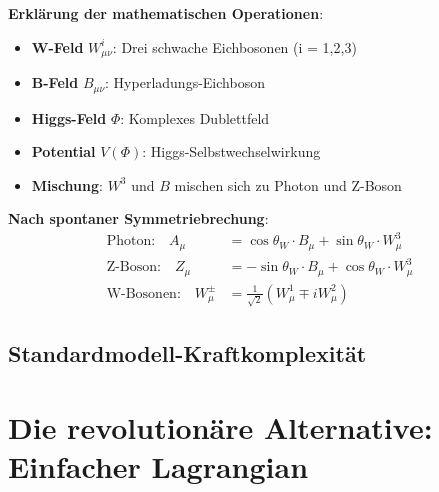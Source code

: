 	\textbf{Erklärung der mathematischen Operationen}:
	\begin{itemize}
		\item \textbf{W-Feld} $W_{\mu\nu}^i$: Drei schwache Eichbosonen (i = 1,2,3)
		\item \textbf{B-Feld} $B_{\mu\nu}$: Hyperladungs-Eichboson
		\item \textbf{Higgs-Feld} $\Phi$: Komplexes Dublettfeld
		\item \textbf{Potential} $V(\Phi)$: Higgs-Selbstwechselwirkung
		\item \textbf{Mischung}: $W^3$ und $B$ mischen sich zu Photon und Z-Boson
	\end{itemize}
	
	\textbf{Nach spontaner Symmetriebrechung}:
	\begin{align}
		\text{Photon:} \quad A_\mu &= \cos\theta_W \cdot B_\mu + \sin\theta_W \cdot W_\mu^3 \\
		\text{Z-Boson:} \quad Z_\mu &= -\sin\theta_W \cdot B_\mu + \cos\theta_W \cdot W_\mu^3 \\
		\text{W-Bosonen:} \quad W_\mu^\pm &= \frac{1}{\sqrt{2}}(W_\mu^1 \mp i W_\mu^2)
	\end{align}
	
	\subsection{Standardmodell-Kraftkomplexität}
	
	\begin{table}[htbp]
		\centering
		\caption{Standardmodell-Kraftkomplexität}
		\label{tab:sm_force_complexity}
	\end{table}
	
	\section{Die revolutionäre Alternative: Einfacher Lagrangian}
	
